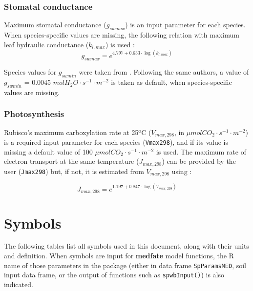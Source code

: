 \documentclass[]{book}
\begin{document}
\hypertarget{stomatal-conductance}{%
\subsection{Stomatal conductance}\label{stomatal-conductance}}

Maximum stomatal conductance (\(g_{swmax}\)) is an input parameter for each species. When species-specific values are missing, the following relation with maximum leaf hydraulic conductance (\(k_{l, max}\)) is used \citep{Mencuccini2003}:
\begin{equation}
g_{swmax} = e^{4.797 + 0.633\cdot \log(k_{l, max})}
\end{equation}

Species values for \(g_{swmin}\) were taken from \citet{Duursma2018}. Following the same authors, a value of \(g_{swmin}\) = 0.0045 \(mol H_2O \cdot s^{-1} \cdot m^{-2}\) is taken as default, when species-specific values are missing.

\hypertarget{photosynthesis}{%
\subsection{Photosynthesis}\label{photosynthesis}}

Rubisco's maximum carboxylation rate at 25ºC (\(V_{max, 298}\), in \(\mu mol CO_2 \cdot s^{-1} \cdot m^{-2}\)) is a required input parameter for each species (\texttt{Vmax298}), and if its value is missing a default value of 100 \(\mu mol CO_2 \cdot s^{-1} \cdot m^{-2}\) is used. The maximum rate of electron transport at the same temperature (\(J_{max, 298}\)) can be provided by the user (\texttt{Jmax298}) but, if not, it is estimated from \(V_{max, 298}\) using \citet{Walker2014}:

\begin{equation}
J_{max, 298} = e^{1.197 + 0.847\cdot \log(V_{max,298})}
\end{equation}

\hypertarget{symbols}{%
\chapter{Symbols}\label{symbols}}

The following tables list all symbols used in this document, along with their units and definition. When symbols are input for \textbf{medfate} model functions, the R name of those parameters in the package (either in data frame \texttt{SpParamsMED}, soil input data frame, or the output of functions such as \texttt{spwbInput()}) is also indicated.
\end{document}
